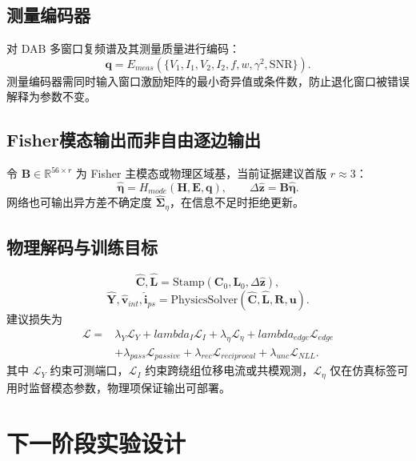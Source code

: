 \documentclass[UTF8,11pt,a4paper]{ctexart}
\newcommand{\mat}[1]{\bm{#1}}
\newcommand{\vect}[1]{\bm{#1}}
\newcommand{\R}{\mathbb{R}}
\begin{document}
\subsection{测量编码器}
对 DAB 多窗口复频谱及其测量质量进行编码：
\begin{equation}
\vect q=E_{meas}\left(\{V_1,I_1,V_2,I_2,f,w,\gamma^2,\mathrm{SNR}\}\right).
\end{equation}
测量编码器需同时输入窗口激励矩阵的最小奇异值或条件数，防止退化窗口被错误解释为参数不变。

\subsection{Fisher模态输出而非自由逐边输出}
令 $\mat B\in\R^{56\times r}$ 为 Fisher 主模态或物理区域基，当前证据建议首版 $r\approx3$：
\begin{equation}
\widehat{\vect\eta}=H_{mode}(\mat H,\mat E,\vect q),
\qquad
\Delta\widehat{\vect z}=\mat B\widehat{\vect\eta}.
\end{equation}
网络也可输出异方差不确定度 $\widehat{\mat\Sigma}_\eta$，在信息不足时拒绝更新。

\subsection{物理解码与训练目标}
\begin{equation}
\widehat{\mat C},\widehat{\mat L}=\mathrm{Stamp}(\mat C_0,\mat L_0,\Delta\widehat{\vect z}),
\end{equation}
\begin{equation}
\widehat{\mat Y},\widehat{\vect v}_{int},\widehat{\vect i}_{ps}
=\mathrm{PhysicsSolver}(\widehat{\mat C},\widehat{\mat L},\mat R,\vect u).
\end{equation}
建议损失为
\begin{align}
\mathcal L={}&\lambda_Y\mathcal L_Y+lambda_I\mathcal L_I
+\lambda_\eta\mathcal L_\eta+lambda_{edge}\mathcal L_{edge}\\
&+\lambda_{pass}\mathcal L_{passive}
+\lambda_{rec}\mathcal L_{reciprocal}
+\lambda_{unc}\mathcal L_{NLL}.
\end{align}
其中 $\mathcal L_Y$ 约束可测端口，$\mathcal L_I$ 约束跨绕组位移电流或共模观测，$\mathcal L_\eta$ 仅在仿真标签可用时监督模态参数，物理项保证输出可部署。

\section{下一阶段实验设计}
\end{document}
